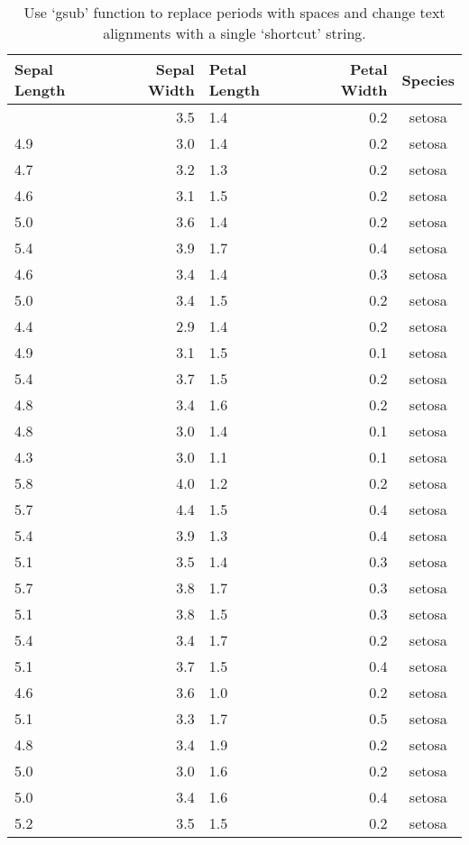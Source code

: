 \documentclass[
  letterpaper,
  DIV=11,
  numbers=noendperiod]{scrartcl}
\begin{document}
\begin{longtable}[]{@{}lrlrc@{}}

\caption{\label{tbl-column-names-alignment2}Use `gsub' function to
replace periods with spaces and change text alignments with a single
`shortcut' string.}

\tabularnewline

\toprule\noalign{}
Sepal Length & Sepal Width & Petal Length & Petal Width & Species \\
\midrule\noalign{}
\endhead
\bottomrule\noalign{}
\endlastfoot
5.1 & 3.5 & 1.4 & 0.2 & setosa \\
4.9 & 3.0 & 1.4 & 0.2 & setosa \\
4.7 & 3.2 & 1.3 & 0.2 & setosa \\
4.6 & 3.1 & 1.5 & 0.2 & setosa \\
5.0 & 3.6 & 1.4 & 0.2 & setosa \\
5.4 & 3.9 & 1.7 & 0.4 & setosa \\
4.6 & 3.4 & 1.4 & 0.3 & setosa \\
5.0 & 3.4 & 1.5 & 0.2 & setosa \\
4.4 & 2.9 & 1.4 & 0.2 & setosa \\
4.9 & 3.1 & 1.5 & 0.1 & setosa \\
5.4 & 3.7 & 1.5 & 0.2 & setosa \\
4.8 & 3.4 & 1.6 & 0.2 & setosa \\
4.8 & 3.0 & 1.4 & 0.1 & setosa \\
4.3 & 3.0 & 1.1 & 0.1 & setosa \\
5.8 & 4.0 & 1.2 & 0.2 & setosa \\
5.7 & 4.4 & 1.5 & 0.4 & setosa \\
5.4 & 3.9 & 1.3 & 0.4 & setosa \\
5.1 & 3.5 & 1.4 & 0.3 & setosa \\
5.7 & 3.8 & 1.7 & 0.3 & setosa \\
5.1 & 3.8 & 1.5 & 0.3 & setosa \\
5.4 & 3.4 & 1.7 & 0.2 & setosa \\
5.1 & 3.7 & 1.5 & 0.4 & setosa \\
4.6 & 3.6 & 1.0 & 0.2 & setosa \\
5.1 & 3.3 & 1.7 & 0.5 & setosa \\
4.8 & 3.4 & 1.9 & 0.2 & setosa \\
5.0 & 3.0 & 1.6 & 0.2 & setosa \\
5.0 & 3.4 & 1.6 & 0.4 & setosa \\
5.2 & 3.5 & 1.5 & 0.2 & setosa \\

\end{longtable}
\end{document}
